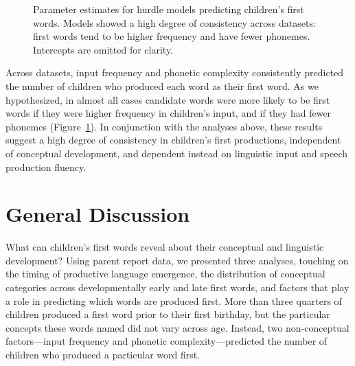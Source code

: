 \documentclass[10pt,letterpaper]{article}
\begin{document}
\begin{figure}[h]
\caption{\label{fig:hurdles} Parameter estimates for hurdle models predicting children's first words. Models showed a high degree of consistency across datasets: first words tend to be higher frequency and have fewer phonemes. Intercepts are omitted for clarity.}
\end{figure}


Across datasets, input frequency and phonetic complexity consistently predicted the number of children who produced each word as their first word. As we hypothesized, in almost all cases candidate words were more likely to be first words if they were higher frequency in children's input, and if they had fewer phonemes (Figure~\ref{fig:hurdles}). In conjunction with the analyses above, these results suggest a high degree of consistency in children's first productions, independent of conceptual development, and dependent instead on linguistic input and speech production fluency.

\section{General Discussion}

What can children's first words reveal about their conceptual and linguistic development? Using parent report data, we presented three analyses, touching on the timing of productive language emergence, the distribution of conceptual categories across developmentally early and late first words, and factors that play a role in predicting which words are produced first. More than three quarters of children produced a first word prior to their first birthday, but the particular concepts these words named did not vary across age. Instead, two non-conceptual factors---input frequency and phonetic complexity---predicted the number of children who produced a particular word first.
\end{document}
